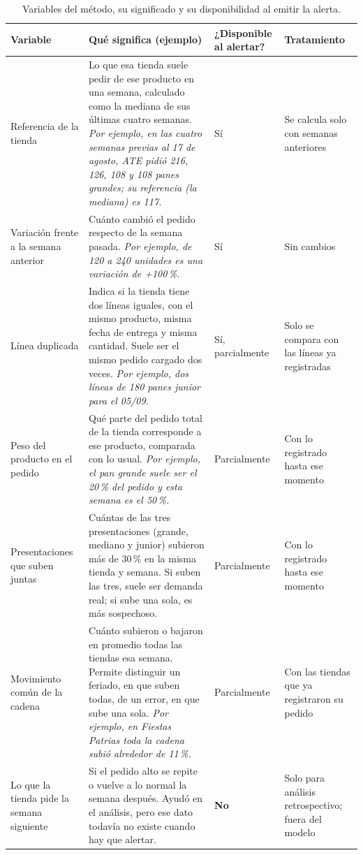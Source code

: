 \begin{table}[htbp]
\centering
\caption{Variables del método, su significado y su disponibilidad al emitir la alerta.}
\label{tab:av-disponibilidad}
\footnotesize
\begin{tabularx}{\textwidth}{@{}L{2.7cm}YL{1.6cm}L{3.1cm}@{}}
\toprule
\textbf{Variable} & \textbf{Qué significa (ejemplo)} & \textbf{¿Disponible al alertar?} & \textbf{Tratamiento} \\
\midrule
Referencia de la tienda & Lo que esa tienda suele pedir de ese producto en una semana, calculado como la mediana de sus últimas cuatro semanas. \emph{Por ejemplo, en las cuatro semanas previas al 17 de agosto, ATE pidió 216, 126, 108 y 108 panes grandes; su referencia (la mediana) es 117.} & Sí & Se calcula solo con semanas anteriores \\
Variación frente a la semana anterior & Cuánto cambió el pedido respecto de la semana pasada. \emph{Por ejemplo, de 120 a 240 unidades es una variación de +100\,\%.} & Sí & Sin cambios \\
Línea duplicada & Indica si la tienda tiene dos líneas iguales, con el mismo producto, misma fecha de entrega y misma cantidad. Suele ser el mismo pedido cargado dos veces. \emph{Por ejemplo, dos líneas de 180 panes junior para el 05/09.} & Sí, parcialmente & Solo se compara con las líneas ya registradas \\
Peso del producto en el pedido & Qué parte del pedido total de la tienda corresponde a ese producto, comparada con lo usual. \emph{Por ejemplo, el pan grande suele ser el 20\,\% del pedido y esta semana es el 50\,\%.} & Parcialmente & Con lo registrado hasta ese momento \\
Presentaciones que suben juntas & Cuántas de las tres presentaciones (grande, mediano y junior) subieron más de 30\,\% en la misma tienda y semana. Si suben las tres, suele ser demanda real; si sube una sola, es más sospechoso. & Parcialmente & Con lo registrado hasta ese momento \\
Movimiento común de la cadena & Cuánto subieron o bajaron en promedio todas las tiendas esa semana. Permite distinguir un feriado, en que suben todas, de un error, en que sube una sola. \emph{Por ejemplo, en Fiestas Patrias toda la cadena subió alrededor de 11\,\%.} & Parcialmente & Con las tiendas que ya registraron su pedido \\
Lo que la tienda pide la semana siguiente & Si el pedido alto se repite o vuelve a lo normal la semana después. Ayudó en el análisis, pero ese dato todavía no existe cuando hay que alertar. & \textbf{No} & Solo para análisis retrospectivo; fuera del modelo \\
\bottomrule
\end{tabularx}
\end{table}

